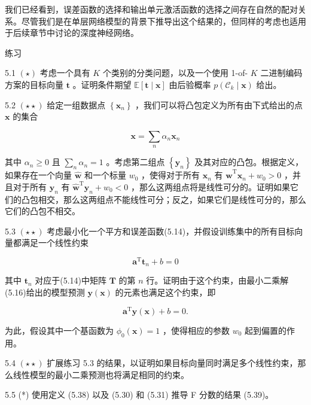 \documentclass[10pt]{report}
\begin{document}
我们已经看到，误差函数的选择和输出单元激活函数的选择之间存在自然的配对关系。尽管我们是在单层网络模型的背景下推导出这个结果的，但同样的考虑也适用于后续章节中讨论的深度神经网络。

练习

5.1 \(\left( \star \right)\) 考虑一个具有 \(K\) 个类别的分类问题，以及一个使用 1-of- \(K\) 二进制编码方案的目标向量 \(\mathbf{t}\) 。证明条件期望 \(\mathbb{E}\left\lbrack  {\mathbf{t} \mid  \mathbf{x}}\right\rbrack\) 由后验概率 \(p\left( {{\mathcal{C}}_{k} \mid  \mathbf{x}}\right)\) 给出。

5.2 \(\left( {\star  \star  }\right)\) 给定一组数据点 \(\left\{  {\mathbf{x}}_{n}\right\}\) ，我们可以将凸包定义为所有由下式给出的点 \(\mathbf{x}\) 的集合

\[
\mathbf{x} = \mathop{\sum }\limits_{n}{\alpha }_{n}{\mathbf{x}}_{n} \tag{5.96}
\]

其中 \({\alpha }_{n} \geq  0\) 且 \(\mathop{\sum }\limits_{n}{\alpha }_{n} = 1\) 。考虑第二组点 \(\left\{  {\mathbf{y}}_{n}\right\}\) 及其对应的凸包。根据定义，如果存在一个向量 \(\widehat{\mathbf{w}}\) 和一个标量 \({w}_{0}\) ，使得对于所有 \({\mathbf{x}}_{n}\) 有 \({\widehat{\mathbf{w}}}^{\mathrm{T}}{\mathbf{x}}_{n} + {w}_{0} > 0\) ，并且对于所有 \({\mathbf{y}}_{n}\) 有 \({\widehat{\mathbf{w}}}^{\mathrm{T}}{\mathbf{y}}_{n} + {w}_{0} < 0\) ，那么这两组点将是线性可分的。证明如果它们的凸包相交，那么这两组点不能线性可分；反之，如果它们是线性可分的，那么它们的凸包不相交。

5.3 \(\left( {\star  \star  }\right)\) 考虑最小化一个平方和误差函数(5.14)，并假设训练集中的所有目标向量都满足一个线性约束

\[
{\mathbf{a}}^{\mathrm{T}}{\mathbf{t}}_{n} + b = 0 \tag{5.97}
\]

其中 \({\mathbf{t}}_{n}\) 对应于(5.14)中矩阵 \(\mathbf{T}\) 的第 \(n\) 行。证明由于这个约束，由最小二乘解(5.16)给出的模型预测 \(\mathbf{y}\left( \mathbf{x}\right)\) 的元素也满足这个约束，即

\[
{\mathbf{a}}^{\mathrm{T}}\mathbf{y}\left( \mathbf{x}\right)  + b = 0. \tag{5.98}
\]

为此，假设其中一个基函数为 \({\phi }_{0}\left( \mathbf{x}\right)  = 1\) ，使得相应的参数 \({w}_{0}\) 起到偏置的作用。

5.4 \(\left( {\star  \star  }\right)\) 扩展练习 5.3 的结果，以证明如果目标向量同时满足多个线性约束，那么线性模型的最小二乘预测也将满足相同的约束。

5.5 (*) 使用定义 (5.38) 以及 (5.30) 和 (5.31) 推导 F 分数的结果 (5.39)。
\end{document}
